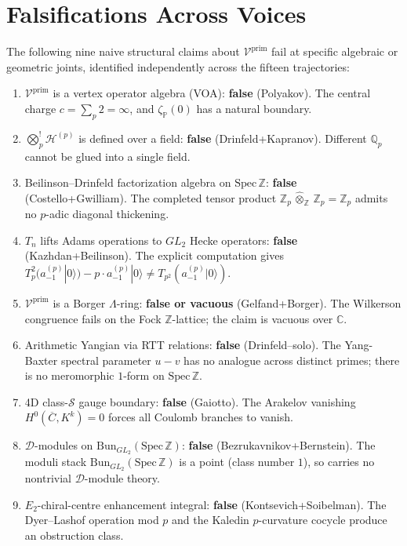 \section{Falsifications Across Voices}
\label{v4-arith:app:B:falsifications}

The following nine naive structural claims about $\mathcal{V}^{\mathrm{prim}}$ fail at specific algebraic or geometric joints, identified independently across the fifteen trajectories:

\begin{enumerate}
\item $\mathcal{V}^{\mathrm{prim}}$ is a vertex operator algebra (VOA):
\textbf{false} (Polyakov). The central charge
$c=\sum_{p}2=\infty$, and $\zeta_{\mathbb{P}}(0)$
has a natural boundary.
\item \(\bigotimes^{!}_{p}\mathcal{H}^{(p)}\) is defined over a field:
\textbf{false} (Drinfeld+Kapranov). Different \(\mathbb{Q}_{p}\)
cannot be glued into a single field.
\item Beilinson--Drinfeld factorization algebra on \(\mathrm{Spec}\,\mathbb{Z}\):
\textbf{false} (Costello+Gwilliam). The completed tensor product
\(\mathbb{Z}_{p}\,\widehat{\otimes}_{\mathbb{Z}}\,\mathbb{Z}_{p}=\mathbb{Z}_{p}\)
admits no $p$-adic diagonal thickening.
\item \(T_{n}\) lifts Adams operations to \(GL_{2}\) Hecke operators:
\textbf{false} (Kazhdan+Beilinson). The explicit computation gives
\(T_{p}^{2}(a^{(p)}_{-1}|0\rangle)-p\cdot a^{(p)}_{-1}|0\rangle\neq T_{p^{2}}(a^{(p)}_{-1}|0\rangle)\).
\item $\mathcal{V}^{\mathrm{prim}}$ is a Borger $\Lambda$-ring:
\textbf{false or vacuous} (Gelfand+Borger). The Wilkerson
congruence fails on the Fock $\mathbb{Z}$-lattice; the claim is
vacuous over $\mathbb{C}$.
\item Arithmetic Yangian via RTT relations:
\textbf{false} (Drinfeld--solo). The Yang-Baxter spectral parameter
$u-v$ has no analogue across distinct primes; there is no meromorphic
$1$-form on $\mathrm{Spec}\,\mathbb{Z}$.
\item 4D class-$\mathcal{S}$ gauge boundary: \textbf{false} (Gaiotto).
The Arakelov vanishing \(H^{0}(\overline{C},K^{k})=0\) forces all
Coulomb branches to vanish.
\item $\mathcal{D}$-modules on \(\mathrm{Bun}_{GL_{2}}(\mathrm{Spec}\,\mathbb{Z})\):
\textbf{false} (Bezrukavnikov+Bernstein).
The moduli stack $\mathrm{Bun}_{GL_{2}}(\mathrm{Spec}\,\mathbb{Z})$
is a point (class number $1$), so carries no nontrivial
$\mathcal{D}$-module theory.
\item $E_{2}$-chiral-centre enhancement integral: \textbf{false}
(Kontsevich+Soibelman). The Dyer--Lashof operation mod $p$ and the
Kaledin $p$-curvature cocycle produce an obstruction class.
\end{enumerate}

